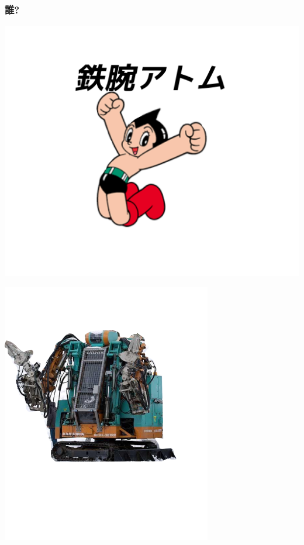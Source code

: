 \subsubsection{誰?}
\label{sec:orgheadline1}

\begin{container-fluid}
\begin{row-fluid}
\begin{span6}
\includegraphics{img/astro/2.png}
\end{span6}
\begin{span6}
\includegraphics{img/rescue/1.png}
\end{span6}
\end{row-fluid}
\begin{row-fluid}
\begin{span12}
\begin{xlarge}
　
\end{xlarge}
\end{span12}
\end{row-fluid}
\end{container-fluid}

